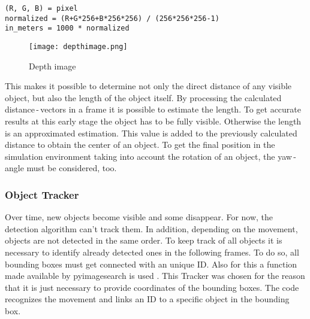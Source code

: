 \begin{lstlisting}[frame=single,basicstyle=\footnotesize]
(R, G, B) = pixel
normalized = (R+G*256+B*256*256) / (256*256*256-1)
in_meters = 1000 * normalized
\end{lstlisting}

\begin{figure}[h]
	\centering
	\texttt{[image: depthimage.png]}
	\caption{Depth image}
	\label{fig:depth image}
\end{figure}

This makes it possible to determine not only the direct distance of any visible object, but also the length of the object itself. By processing the calculated distance\,-\,vectors in a frame it is possible to estimate the length. To get accurate results at this early stage the object has to be fully visible. Otherwise the length is an approximated estimation. 
This value is added to the previously calculated distance to obtain the center of an object. To get the final position in the simulation environment taking into account the rotation of an object, the yaw\,-\,angle must be considered, too.\\


\subsubsection{Object Tracker}
Over time, new objects become visible and some disappear. For now, the detection algorithm can't track them. In addition, depending on the movement, objects are not detected in the same order. To keep track of all objects it is necessary to identify already detected ones in the following frames. To do so, all bounding boxes must get connected with an unique \ac{ID}. Also for this a function made available by pyimagesearch is used \cite{Tracker}. This Tracker was chosen for the reason that it is just necessary to provide coordinates of the bounding boxes. The code recognizes the movement and links an ID to a specific object in the bounding box.\\

